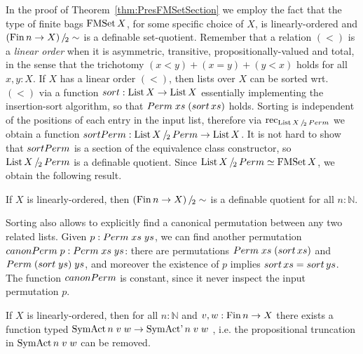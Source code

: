 \documentclass[a4paper,USenglish,cleveref]{lipics-v2021}
\begin{document}
In the proof of Theorem~\ref{thm:PresFMSetSection} we employ the fact that the type of finite bags $\FMSet X$, for some specific choice of $X$, is linearly-ordered and $\SetQuot[(\Fin n \to X)][\sim]$ is a definable set-quotient.
Remember that a relation $(<)$ is a \emph{linear order} when it is asymmetric, transitive, propositionally-valued and total, in the sense that the trichotomy $(x < y) + (x = y) + (y < x)$ holds for all $x,y:X$.
If $X$ has a linear order $(<)$, then lists over $X$ can be sorted wrt. $(<)$ via a function $\sort : \List X \to \List X$ essentially implementing the insertion-sort algorithm, so that $\Perm \;xs\;(\sort\,xs)$ holds. Sorting is independent of the positions of each entry in the input list, therefore via $\Rec{\SetQuot[\List X][\Perm]}$ we obtain a function $\sortPerm : \SetQuot[\List X][\Perm] \to \List X$. It is not hard to show that $\sortPerm$ is a section of the equivalence class constructor, so $\SetQuot[\List X][\Perm]$ is a definable quotient.
Since $\SetQuot[\List X][\Perm] \simeq \FMSet X$, we obtain the following result.
\begin{proposition}\label{prop:ListPermDefQuot}
If $X$ is linearly-ordered, then $\SetQuot[(\Fin n \to X)][\sim]$ is a definable quotient for all $n : ℕ$.
\end{proposition}

Sorting also allows to explicitly find a canonical permutation between any two related lists. Given $p : \Perm \;xs\;ys$, we can find another permutation $\canonicalPerm \;p : \Perm\;xs\;ys$: there are permutations $\Perm\;xs\;(\sort\,xs)$ and $\Perm\;(\sort\;ys)\;ys$, and moreover the existence of $p$ implies $\sort\,xs = \sort\,ys$. The function $\canonicalPerm$ is constant, since it never inspect the input permutation $p$. 
\begin{proposition}\label{prop:ListPermCanonicalPerm}
If $X$ is linearly-ordered, then for all $n : ℕ$ and $v,w : \Fin n \to X$ there exists a function typed $\SymAct n\; v\; w \to \SymActSigma n \;v \; w$ , i.e. the propositional truncation in $\SymAct n\; v\; w$ can be removed.
\end{proposition}
\end{document}
